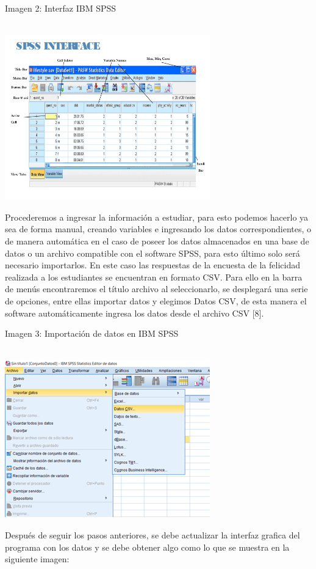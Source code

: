 \documentclass[conference]{IEEEtran}
\begin{document}
  \begin{center}
\caption{Imagen 2: Interfaz IBM SPSS}\\
\includegraphics{imagenes/2.png}
\end{center}
   Procederemos a ingresar la información a estudiar, para esto podemos hacerlo ya sea de forma manual, creando variables e ingresando los datos correspondientes, o de manera automática en el caso de poseer los datos almacenados en una base de datos o un archivo compatible con el software SPSS, para esto último solo será necesario importarlos. En este caso las respuestas de la encuesta de la felicidad realizada a los estudiantes se encuentran en formato CSV. Para ello en la barra de menús encontraremos el título archivo al seleccionarlo, se desplegará una serie de opciones, entre ellas importar datos y elegimos Datos CSV, de esta manera el software automáticamente ingresa los datos desde el archivo CSV [8].\\
\begin{center}
\caption{Imagen 3: Importación de datos en IBM SPSS}\\
\includegraphics[scale=1]{imagenes/IMAGEN3.png}
\end{center}
   Después de seguir los pasos anteriores, se debe actualizar la interfaz grafica del programa con los datos y se debe obtener algo como lo que se muestra en la siguiente imagen: \\
\end{document}
